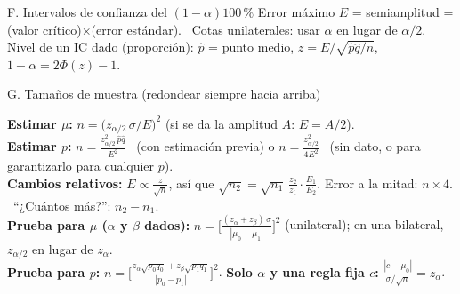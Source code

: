 {\begin{hoja}{F. Intervalos de confianza del $(1-\alpha)100\,\%$}
\smallskip
Error máximo $E$ = semiamplitud = (valor crítico)$\times$(error estándar). \ Cotas unilaterales: usar $\alpha$ en lugar de $\alpha/2$.\\
Nivel de un IC dado (proporción): $\hat p$ = punto medio, $z=E/\sqrt{\hat p\hat q/n}$, \ $1-\alpha=2\Phi(z)-1$.
\end{hoja}

\begin{hoja}[unbreakable]{G. Tamaños de muestra (redondear siempre hacia arriba)}
\raggedright
\textbf{Estimar $\mu$:} $n=\big(z_{\alpha/2}\,\sigma/E\big)^2$ \quad (si se da la amplitud $A$: $E=A/2$).\\
\textbf{Estimar $p$:} $n=\frac{z_{\alpha/2}^2\,\hat p\hat q}{E^2}$ \ (con estimación previa) \quad o \quad $n=\frac{z_{\alpha/2}^2}{4E^2}$ \ (sin dato, o para garantizarlo para cualquier $p$).\\
\textbf{Cambios relativos:} $E\propto\frac{z}{\sqrt n}$, así que $\sqrt{n_2}=\sqrt{n_1}\,\frac{z_2}{z_1}\cdot\frac{E_1}{E_2}$. Error a la mitad: $n\times4$. \ ``¿Cuántos más?'': $n_2-n_1$.\\
\textbf{Prueba para $\mu$ ($\alpha$ y $\beta$ dados):} $n=\Big[\frac{(z_\alpha+z_\beta)\,\sigma}{|\mu_0-\mu_1|}\Big]^2$ (unilateral); en una bilateral, $z_{\alpha/2}$ en lugar de $z_\alpha$.\\
\textbf{Prueba para $p$:} $n=\Big[\frac{z_\alpha\sqrt{p_0q_0}+z_\beta\sqrt{p_1q_1}}{|p_0-p_1|}\Big]^2$. \quad \textbf{Solo $\alpha$ y una regla fija $c$:} $\frac{|c-\mu_0|}{\sigma/\sqrt n}=z_\alpha$.
\end{hoja}

}
